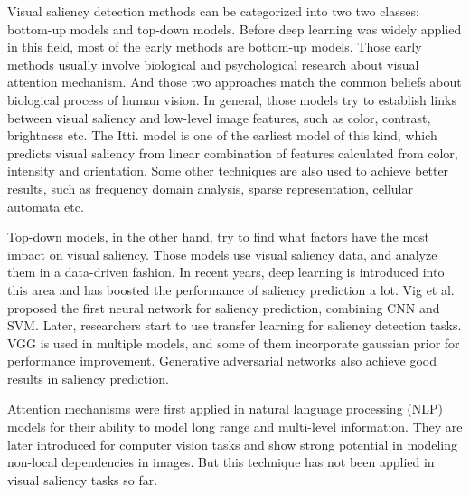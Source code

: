 \documentclass[12pt]{article}
\begin{document}
Visual saliency detection methods can be categorized into two two classes: bottom-up models and top-down models\cite{congReviewVisualSaliency2019}.
Before deep learning was widely applied in this field, most of the early methods are bottom-up models.
Those early methods usually involve biological and psychological research about visual attention mechanism. And those two approaches match the common beliefs about biological process of human vision.
In general, those models try to establish links between visual saliency and low-level image features, such as color, contrast, brightness etc. The Itti. model\cite{ittiModelSaliencybasedVisual1998}
is one of the earliest model of this kind, which predicts visual saliency from linear combination of features calculated from color, intensity and orientation.
Some other techniques are also used to achieve better results, such as frequency domain analysis, sparse representation, cellular automata etc\cite{congReviewVisualSaliency2019}.

Top-down models, in the other hand, try to find what factors have the most impact on visual saliency. Those models use visual saliency data, and analyze them in a data-driven fashion.
In recent years, deep learning is introduced into this area and has boosted the performance of saliency prediction a lot.
Vig et al. \cite{vigLargeScaleOptimizationHierarchical2014} proposed the first neural network for saliency prediction, combining CNN and SVM. Later, researchers start to use transfer learning for saliency 
detection tasks. VGG is used in multiple models\cite{kruthiventiDeepFixFullyConvolutional2015, kummererDeepGazeIIReading2016, corniaPredictingHumanEye2018}, and some of them incorporate gaussian prior for performance improvement.
Generative adversarial networks also achieve good results in saliency prediction\cite{panSalGANVisualSaliency2018, cheHowGazeInfluenced2020}.

Attention mechanisms were first applied in natural language processing (NLP) models for their ability to model long range and multi-level information\cite{bahdanauNeuralMachineTranslation2016a, vaswaniAttentionAllYou2017a}.
They are later introduced for computer vision tasks and show strong potential in modeling non-local dependencies in images\cite{zhangSelfAttentionGenerativeAdversarial2019a}.
But this technique has not been applied in visual saliency tasks so far.
\end{document}

